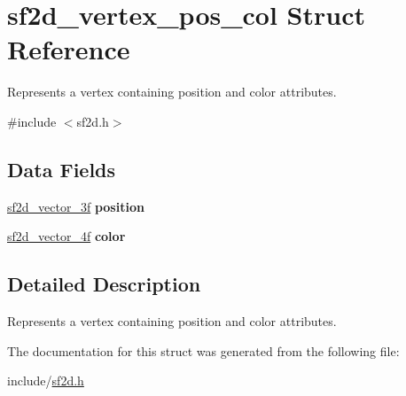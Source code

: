 \hypertarget{structsf2d__vertex__pos__col}{\section{sf2d\-\_\-vertex\-\_\-pos\-\_\-col Struct Reference}
\label{structsf2d__vertex__pos__col}
}


Represents a vertex containing position and color attributes.  




{\ttfamily \#include $<$sf2d.\-h$>$}

\subsection*{Data Fields}
\begin{DoxyCompactItemize}
\item 
\hypertarget{structsf2d__vertex__pos__col_a72c48b1c976984ef0512a28e8af7a1e4}{\hyperlink{structsf2d__vector__3f}{sf2d\-\_\-vector\-\_\-3f} {\bfseries position}}\label{structsf2d__vertex__pos__col_a72c48b1c976984ef0512a28e8af7a1e4}

\item 
\hypertarget{structsf2d__vertex__pos__col_a9dcaaa5fac4047a013d1737f42e6b8e8}{\hyperlink{structsf2d__vector__4f}{sf2d\-\_\-vector\-\_\-4f} {\bfseries color}}\label{structsf2d__vertex__pos__col_a9dcaaa5fac4047a013d1737f42e6b8e8}

\end{DoxyCompactItemize}


\subsection{Detailed Description}
Represents a vertex containing position and color attributes. 

The documentation for this struct was generated from the following file\-:\begin{DoxyCompactItemize}
\item 
include/\hyperlink{sf2d_8h}{sf2d.\-h}\end{DoxyCompactItemize}
